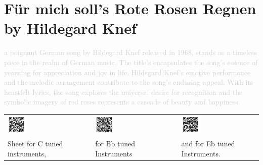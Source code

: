 \chapter[Für mich soll's Rote Rosen Regnen]{Für mich soll's Rote Rosen Regnen \\[1ex]\large{by Hildegard Knef}}

\textcolor{lightgray}{a poignant German song by Hildegard Knef released in 1968, stands as a timeless piece in the realm of German music. The title's encapsulates the song's essence of yearning for appreciation and joy in life. Hildegard Knef's emotive performance and the melodic arrangement contribute to the song's enduring appeal. With its heartfelt lyrics, the song explores the universal desire for recognition and the symbolic imagery of red roses represents a cascade of beauty and happiness.}

\begin{tabular}{p{} p{} p{}  p{} p{}}
  \includegraphics[width=0.25\textwidth]{QR_Codes/QR_RoteRosenRegnen_C.png}
  &
  &
  \includegraphics[width=0.25\textwidth]{QR_Codes/QR_RoteRosenRegnen_Bb.png}
  &
  &
  \includegraphics[width=0.25\textwidth]{QR_Codes/QR_RoteRosenRegnen_Eb.png}\\                                                     
   Sheet for C tuned instruments,
   &
   &
   for Bb tuned Instruments
   &
   &
   and for Eb tuned Instruments.\\
\end{tabular}